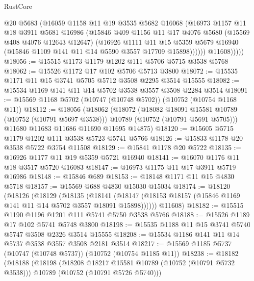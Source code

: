 \begin{lexlean}{RustCore}
\begin{coremodule}
                @20
                @5683
                (@16059
                  @1158
                  @11
                  @19
                  @3535
                  @5682
                  @16068
                  (@16973
                    @1157
                    @11
                    @18
                    @3911
                    @5681
                    @16986
                    (@15846
                      @409
                      @1156
                      @11
                      @17
                      @4076
                      @5680
                      (@15569 @408 @4076 @12643 @12647)
                      (@16926
                        @1111
                        @11
                        @15
                        @5359
                        @5679
                        @16940
                        (@15846 @1109 @141 @11 @14 @5590 @3557 @17709 @15898))))))
              @11608)))))
@18056 := @15515 @1173 @1179 @1202 @111 @5706 @5715 @3538 @5768
@18062 := @15526 @1172 @17 @102 @5706 @5713 @3800
@18072 := @15535 @1171 @11 @15 @3741 @5705 @5712 @3508 @2295 @3514 @15555
@18082 := @15534 @1169 @141 @11 @14 @5702 @3538 @3557 @3508 @2284 @3514
@18091 := @15569 @1168 @5702 (@10747 (@10748 @5702)) (@10752 (@10754 @1168 @11))
@18112 := @18056
    (@18062
      (@18072
        (@18082 @18091 @15581 @10789 (@10752 (@10791 @5697 @3538)))
        @10789
        (@10752 (@10791 @5691 @5705)))
      @11680
      @11683
      @11686
      @11690
      @11695
      @14875)
@18120 := @15605 @5715 @1179 @1202 @111 @3538 @5723 @5741 @5766
@18126 := @15833 @1178 @20 @3538 @5722 @3754 @11508
@18129 := @15841 @1178 @20 @5722
@18135 := @16926 @1177 @11 @19 @5359 @5721 @16940
@18141 := @16070 @1176 @11 @18 @3517 @5720 @16083
@18147 := @16973 @1175 @11 @17 @3911 @5719 @16986
@18148 := @15846 @689
@18153 := @18148 @1171 @11 @15 @4830 @5718
@18157 := @15569 @688 @4830 @15030 @15034
@18174 := @18120
    (@18126
      (@18129
        (@18135
          (@18141 (@18147 (@18153 @18157 (@15846 @1169 @141 @11 @14 @5702 @3557 @18091 @15898))))))
      @11608)
@18182 := @15515 @1190 @1196 @1201 @111 @5741 @5750 @3538 @5766
@18188 := @15526 @1189 @17 @102 @5741 @5748 @3800
@18198 := @15535 @1188 @11 @15 @3741 @5740 @5747 @3508 @2326 @3514 @15555
@18208 := @15534 @1186 @141 @11 @14 @5737 @3538 @3557 @3508 @2181 @3514
@18217 := @15569 @1185 @5737 (@10747 (@10748 @5737)) (@10752 (@10754 @1185 @11))
@18238 := @18182
    (@18188
      (@18198
        (@18208 @18217 @15581 @10789 (@10752 (@10791 @5732 @3538)))
        @10789
        (@10752 (@10791 @5726 @5740)))

\end{coremodule}
\end{lexlean}
